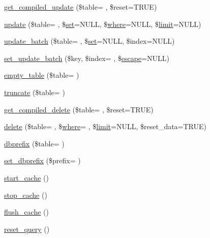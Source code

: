 \begin{DoxyCompactItemize}
\item 
\hyperlink{class_c_i___d_b__query__builder_ac4dfdf5d7bf2a6545312ddb9711e8105}{get\+\_\+compiled\+\_\+update} (\$table= \textquotesingle{}\textquotesingle{}, \$reset=T\+R\+U\+E)
\item 
\hyperlink{class_c_i___d_b__query__builder_a7f1bcfcca3cb9fe450f21737028040a7}{update} (\$table= \textquotesingle{}\textquotesingle{}, \$\hyperlink{class_c_i___d_b__query__builder_ad24529c8e6cd4e3f58c0a3e55815b532}{set}=N\+U\+L\+L, \$\hyperlink{class_c_i___d_b__query__builder_a2356c4b7b93fb83c62a354a8a0748222}{where}=N\+U\+L\+L, \$\hyperlink{class_c_i___d_b__query__builder_a875b0d4703f176c36e771d728a9a04a0}{limit}=N\+U\+L\+L)
\item 
\hyperlink{class_c_i___d_b__query__builder_a3a7d52e50b609117b3ca44a4dfeca263}{update\+\_\+batch} (\$table= \textquotesingle{}\textquotesingle{}, \$\hyperlink{class_c_i___d_b__query__builder_ad24529c8e6cd4e3f58c0a3e55815b532}{set}=N\+U\+L\+L, \$index=N\+U\+L\+L)
\item 
\hyperlink{class_c_i___d_b__query__builder_ad1ee3730f9e7ca2f6613a7bae29f61bf}{set\+\_\+update\+\_\+batch} (\$key, \$index= \textquotesingle{}\textquotesingle{}, \$\hyperlink{class_c_i___d_b__driver_ac8f37ca5703d4558c732e692194f8cd6}{escape}=N\+U\+L\+L)
\item 
\hyperlink{class_c_i___d_b__query__builder_adb594700d683271e17cc5041099d8d40}{empty\+\_\+table} (\$table= \textquotesingle{}\textquotesingle{})
\item 
\hyperlink{class_c_i___d_b__query__builder_a59e71805908a91d2b45089c0137b5bc7}{truncate} (\$table= \textquotesingle{}\textquotesingle{})
\item 
\hyperlink{class_c_i___d_b__query__builder_a0e5685905e73c6604c986e3f6e2ff973}{get\+\_\+compiled\+\_\+delete} (\$table= \textquotesingle{}\textquotesingle{}, \$reset=T\+R\+U\+E)
\item 
\hyperlink{class_c_i___d_b__query__builder_a98c786dcc4964dbb2307636c523c1ebd}{delete} (\$table= \textquotesingle{}\textquotesingle{}, \$\hyperlink{class_c_i___d_b__query__builder_a2356c4b7b93fb83c62a354a8a0748222}{where}= \textquotesingle{}\textquotesingle{}, \$\hyperlink{class_c_i___d_b__query__builder_a875b0d4703f176c36e771d728a9a04a0}{limit}=N\+U\+L\+L, \$reset\+\_\+data=T\+R\+U\+E)
\item 
\hyperlink{class_c_i___d_b__query__builder_a1e6bfc7a51f973e57bc948474e699e96}{dbprefix} (\$table= \textquotesingle{}\textquotesingle{})
\item 
\hyperlink{class_c_i___d_b__query__builder_a18182914d989b4d6781bda1163db31d7}{set\+\_\+dbprefix} (\$prefix= \textquotesingle{}\textquotesingle{})
\item 
\hyperlink{class_c_i___d_b__query__builder_a2d4f0c7b71f87dc7ca7f7fcfbdd12ba0}{start\+\_\+cache} ()
\item 
\hyperlink{class_c_i___d_b__query__builder_a612e54a6230b7e899c4d2a42a234bd5a}{stop\+\_\+cache} ()
\item 
\hyperlink{class_c_i___d_b__query__builder_aa3c94d79d552f6e10277b01c447ebbb6}{flush\+\_\+cache} ()
\item 
\hyperlink{class_c_i___d_b__query__builder_a66636a017a1115d983424cdfca677ddf}{reset\+\_\+query} ()
\end{DoxyCompactItemize}
